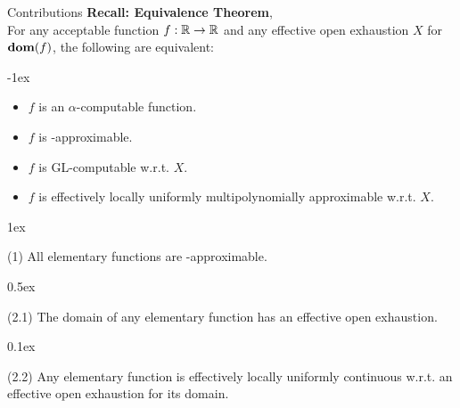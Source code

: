 \begin{frame}{Contributions}
    \vspace{-1em}
    {\color{gray}
    \textcolor{OliveGreen}{\textbf{Recall: Equivalence Theorem}, \citep{ModelOfCompForPartFunc_MingQuanFuAndJeffZucker}}\\
    For any {acceptable function} $f:\mathbb{R}\to\mathbb{R}$ and any {effective open exhaustion} $X$ for $\mathbf{dom}(f)$, the following are equivalent:}

    \kern-1ex
        \begin{itemize}
            \setlength\itemsep{-3pt}\color{gray}
            \item $f$ is an $\alpha$-computable function.
            \item $f$ is \WhileCC-approximable.
            \item $f$ is GL-computable w.r.t. $X$.
            \item $f$ is effectively locally uniformly multipolynomially approximable w.r.t. $X$.
        \end{itemize}

    \kern1ex
    \begin{ntheorem}(1)
        All elementary functions are \WhileCC-approximable.
    \end{ntheorem}

    \kern0.5ex
    \begin{ntheorem}(2.1)
        The domain of any elementary function has an effective open exhaustion.
    \end{ntheorem}
    \pause
    
    \kern0.1ex
    \begin{ntheorem}(2.2)
        Any elementary function is {effectively locally uniformly continuous} w.r.t.\null{} an effective open exhaustion for its domain.
    \end{ntheorem}
\end{frame}
